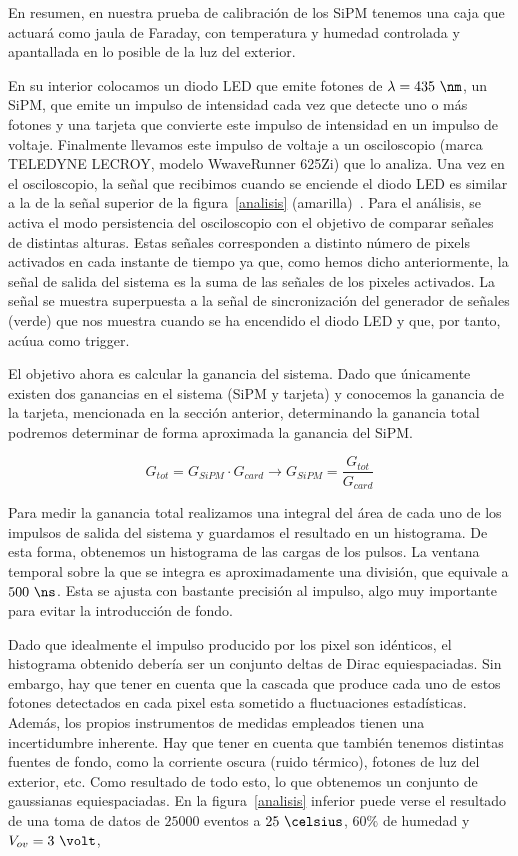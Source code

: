 En resumen, en nuestra prueba de calibración de los SiPM tenemos una caja que actuará como jaula de Faraday, con temperatura y humedad controlada y apantallada en lo posible de la luz del exterior. 

En su interior colocamos un diodo LED que emite fotones de $\lambda=435~\nm$, un SiPM, que emite un impulso de intensidad cada vez que detecte uno o más  fotones  y una tarjeta que convierte este impulso de intensidad en un impulso de voltaje. Finalmente llevamos este impulso de voltaje a un osciloscopio (marca TELEDYNE LECROY, modelo WwaveRunner 625Zi) que lo analiza. 
Una vez en el osciloscopio, la señal que recibimos cuando se enciende el diodo LED es similar a la de la señal superior de la figura~\ref{analisis} (amarilla)~\cite{inftec}. Para el análisis,  se  activa el modo persistencia del osciloscopio con el objetivo de comparar señales de distintas alturas. Estas señales corresponden a distinto número de pixels activados en cada instante de tiempo ya que, como hemos dicho anteriormente, la señal de salida del sistema es la suma de las señales de los pixeles activados. La señal se muestra superpuesta a la señal de sincronización del generador de señales (verde) que nos muestra cuando se ha encendido el diodo LED y que, por tanto, acúua como trigger.

El objetivo ahora es calcular la ganancia del sistema. Dado que únicamente existen dos ganancias en el sistema (SiPM y tarjeta) y conocemos la ganancia de la tarjeta, mencionada en la sección anterior, determinando la ganancia total podremos determinar de forma aproximada la ganancia del SiPM. 

\begin{equation}
G_{tot}=G_{SiPM} \cdotp G_{card} \longrightarrow G_{SiPM} = \frac{G_{tot}}{G_{card}}
\label{ganancias}
\end{equation}

Para medir la ganancia total realizamos una integral del área de cada uno de los impulsos de salida del sistema y guardamos el resultado en un histograma. De esta forma, obtenemos un histograma de las cargas de los pulsos. La ventana temporal sobre la que se integra es aproximadamente una división, que equivale a $500~\ns$. Esta se ajusta con bastante precisión al impulso, algo muy importante para evitar la introducción de fondo.

Dado que idealmente el impulso producido por  los pixel son idénticos, el histograma obtenido debería ser  un conjunto deltas de Dirac equiespaciadas. Sin embargo, hay que tener en cuenta que la cascada que produce cada uno de estos fotones detectados en cada pixel esta sometido a fluctuaciones estadísticas. Además, los propios instrumentos de medidas empleados tienen una incertidumbre inherente. Hay que tener en cuenta que también tenemos distintas fuentes de fondo, como la corriente oscura (ruido térmico), fotones de luz del exterior, etc. 
Como resultado de todo esto, lo que obtenemos un conjunto de gaussianas equiespaciadas. En la figura~\ref{analisis} inferior puede verse el resultado de una toma de datos de $25000$ eventos a $25~\celsius$, $60\%$ de humedad y $V_{ov}=3~\volt$,

